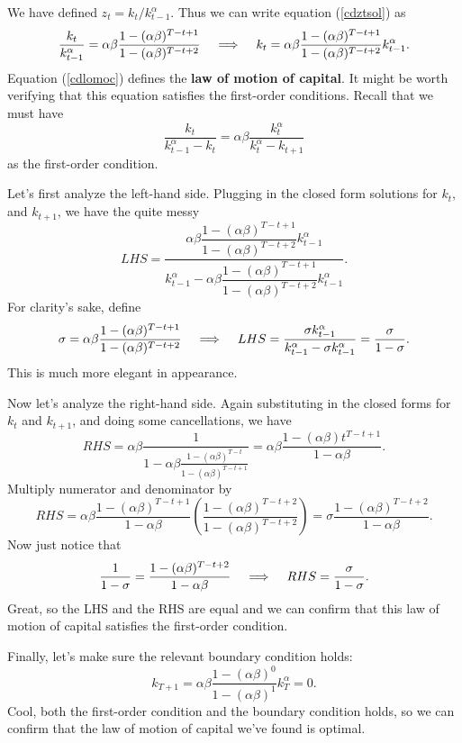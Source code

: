 \documentclass[12pt]{article}
\newcommand{\Lindent}{\hspace{.4cm} \Longrightarrow \hspace{.4cm}}
\theoremstyle{definition}
\begin{document}
We have defined $z_t = k_t / k^{\alpha}_{t-1}$.  Thus we can write equation (\ref{cdztsol}) as 
\begin{equation}
	\frac{k_t}{k^{\alpha}_{t-1}} = 	\alpha \beta\frac{ 1 - (\alpha \beta)^{T -t +1}}{ 1 - (\alpha \beta)^{T -t +2}} \Lindent k_t = \alpha \beta \frac{ 1 - (\alpha \beta)^{T -t +1}}{ 1 - (\alpha \beta)^{T -t +2}}k^{\alpha}_{t-1}. \label{cdlomoc} 
\end{equation}
Equation (\ref{cdlomoc}) defines the \textbf{law of motion of capital}. It might be worth verifying that this equation satisfies the first-order conditions. Recall that we must have
	\[\frac{k_t}{k_{t-1}^{\alpha} - k_t}= \alpha \beta \frac{ k_t^{\alpha}}{k_t^{\alpha} - k_{t+1}}	\]
as the first-order condition.

Let's first analyze the left-hand side. Plugging in the closed form solutions for $k_t$, and $k_{t+1}$, we have the quite messy
	\[LHS = \dfrac{ \alpha \beta \dfrac{ 1 - (\alpha \beta)^{T -t +1}}{ 1 - (\alpha \beta)^{T -t +2}}k^{\alpha}_{t-1}}{k_{t-1}^{\alpha} -  \alpha \beta\dfrac{ 1 - (\alpha \beta)^{T -t +1}}{ 1 - (\alpha \beta)^{T -t +2}}k^{\alpha}_{t-1}}.\]
For clarity's sake, define 
	\[ \sigma = \alpha \beta \frac{ 1 - (\alpha \beta)^{T -t +1}}{ 1 - (\alpha \beta)^{T -t +2}} \Lindent LHS = \frac{ \sigma k^{\alpha}_{t-1}}{k_{t-1}^{\alpha} -  \sigma k^{\alpha}_{t-1}} = \frac{\sigma}{1 - \sigma}.\]
This is much more elegant in appearance.

Now let's analyze the right-hand side. Again substituting in the closed forms for $k_t$ and $k_{t+1}$, and doing some cancellations, we have
	\[	RHS = \alpha \beta \frac{1}{1 - \alpha \beta \frac{ 1 - (\alpha \beta)^{T -t}}{ 1 - (\alpha \beta)^{T -t +1}}} = \alpha \beta \frac{1 - (\alpha \beta)t^{T -t +1}}{ 1 - \alpha \beta}.	\]
Multiply numerator and denominator by 
\[	RHS =  \alpha \beta \frac{1 - (\alpha \beta)^{T -t +1}}{ 1 - \alpha \beta} \left( \frac{ 1 - (\alpha \beta)^{T -t +2}}{ 1 - (\alpha \beta)^{T -t +2}} \right) = \sigma \frac{ 1 - (\alpha \beta)^{T -t +2}}{1 - \alpha \beta}.	\]
Now just notice that 
	\[ \frac{1}{1 - \sigma} =   \frac{   1 - (\alpha \beta)^{T -t +2} }{ 1 - \alpha \beta} \Lindent RHS= \frac{\sigma}{1- \sigma}.	\]
Great, so the LHS and the RHS are equal and we can confirm that this law of motion of capital satisfies the first-order condition.

Finally, let's make sure the relevant boundary condition holds:
\[	 k_{T+1} = \alpha \beta \frac{ 1 - (\alpha \beta)^{0}}{ 1 - (\alpha \beta)^{1}}k^{\alpha}_{T} =0. \]
Cool, both the first-order condition and the boundary condition holds, so we can confirm that the law of motion of capital we've found is optimal. 
\end{document}
